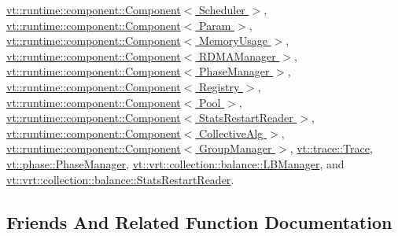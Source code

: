 \hyperlink{structvt_1_1runtime_1_1component_1_1_component_aad3974307ab3b2e1df389a91310f68c2}{vt\+::runtime\+::component\+::\+Component$<$ Scheduler $>$}, \hyperlink{structvt_1_1runtime_1_1component_1_1_component_aad3974307ab3b2e1df389a91310f68c2}{vt\+::runtime\+::component\+::\+Component$<$ Param $>$}, \hyperlink{structvt_1_1runtime_1_1component_1_1_component_aad3974307ab3b2e1df389a91310f68c2}{vt\+::runtime\+::component\+::\+Component$<$ Memory\+Usage $>$}, \hyperlink{structvt_1_1runtime_1_1component_1_1_component_aad3974307ab3b2e1df389a91310f68c2}{vt\+::runtime\+::component\+::\+Component$<$ R\+D\+M\+A\+Manager $>$}, \hyperlink{structvt_1_1runtime_1_1component_1_1_component_aad3974307ab3b2e1df389a91310f68c2}{vt\+::runtime\+::component\+::\+Component$<$ Phase\+Manager $>$}, \hyperlink{structvt_1_1runtime_1_1component_1_1_component_aad3974307ab3b2e1df389a91310f68c2}{vt\+::runtime\+::component\+::\+Component$<$ Registry $>$}, \hyperlink{structvt_1_1runtime_1_1component_1_1_component_aad3974307ab3b2e1df389a91310f68c2}{vt\+::runtime\+::component\+::\+Component$<$ Pool $>$}, \hyperlink{structvt_1_1runtime_1_1component_1_1_component_aad3974307ab3b2e1df389a91310f68c2}{vt\+::runtime\+::component\+::\+Component$<$ Stats\+Restart\+Reader $>$}, \hyperlink{structvt_1_1runtime_1_1component_1_1_component_aad3974307ab3b2e1df389a91310f68c2}{vt\+::runtime\+::component\+::\+Component$<$ Collective\+Alg $>$}, \hyperlink{structvt_1_1runtime_1_1component_1_1_component_aad3974307ab3b2e1df389a91310f68c2}{vt\+::runtime\+::component\+::\+Component$<$ Group\+Manager $>$}, \hyperlink{structvt_1_1trace_1_1_trace_a5dd8767d9020ebeaba49ea3a684738a1}{vt\+::trace\+::\+Trace}, \hyperlink{structvt_1_1phase_1_1_phase_manager_a541d1f6c7a350fad979911ac60f38025}{vt\+::phase\+::\+Phase\+Manager}, \hyperlink{structvt_1_1vrt_1_1collection_1_1balance_1_1_l_b_manager_add5427abf4c6e21e39f581635997ddac}{vt\+::vrt\+::collection\+::balance\+::\+L\+B\+Manager}, and \hyperlink{structvt_1_1vrt_1_1collection_1_1balance_1_1_stats_restart_reader_a0a2bd4e4f989766216237d6aedfaaa51}{vt\+::vrt\+::collection\+::balance\+::\+Stats\+Restart\+Reader}.



\subsection{Friends And Related Function Documentation}
\mbox{\label{structvt_1_1runtime_1_1component_1_1_base_component_a82123f8d3dae68c38bd13d269d00b4c5}} 
